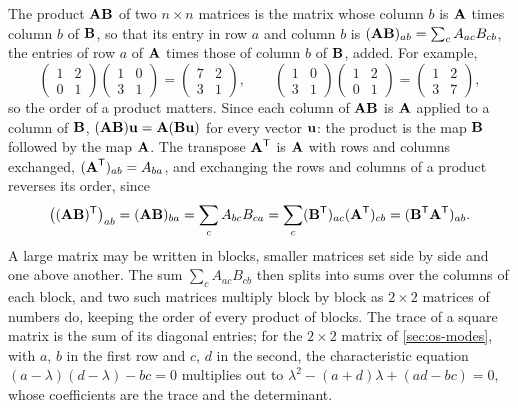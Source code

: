 \begin{toolbox}
The product $\bm{\mathrm{A}}\bm{\mathrm{B}}$ of two $n\times n$ matrices is the matrix whose
column $b$ is $\bm{\mathrm{A}}$ times column $b$ of $\bm{\mathrm{B}}$, so that its entry in
row $a$ and column $b$ is $(\bm{\mathrm{A}}\bm{\mathrm{B}})_{ab} = \sum_c A_{ac}B_{cb}$, the
entries of row $a$ of $\bm{\mathrm{A}}$ times those of column $b$ of $\bm{\mathrm{B}}$,
added. For example,
\begin{equation*}
   \begin{pmatrix} 1 & 2\\ 0 & 1 \end{pmatrix}
   \begin{pmatrix} 1 & 0\\ 3 & 1 \end{pmatrix}
   = \begin{pmatrix} 7 & 2\\ 3 & 1 \end{pmatrix} ,
   \qquad
   \begin{pmatrix} 1 & 0\\ 3 & 1 \end{pmatrix}
   \begin{pmatrix} 1 & 2\\ 0 & 1 \end{pmatrix}
   = \begin{pmatrix} 1 & 2\\ 3 & 7 \end{pmatrix} ,
\end{equation*}
so the order of a product matters. Since each column of $\bm{\mathrm{A}}\bm{\mathrm{B}}$ is
$\bm{\mathrm{A}}$ applied to a column of $\bm{\mathrm{B}}$, $(\bm{\mathrm{A}}\bm{\mathrm{B}})\bm{\mathrm{u}} =
\bm{\mathrm{A}}(\bm{\mathrm{B}}\bm{\mathrm{u}})$ for every vector $\bm{\mathrm{u}}$: the product is the map
$\bm{\mathrm{B}}$ followed by the map $\bm{\mathrm{A}}$. The transpose $\bm{\mathrm{A}}^{\mathsf T}$
is $\bm{\mathrm{A}}$ with rows and columns exchanged, $(\bm{\mathrm{A}}^{\mathsf T})_{ab} =
A_{ba}$, and exchanging the rows and columns of a product reverses its
order, since
\begin{equation*}
   \bigl((\bm{\mathrm{A}}\bm{\mathrm{B}})^{\mathsf T}\bigr)_{ab} = (\bm{\mathrm{A}}\bm{\mathrm{B}})_{ba}
   = \sum_c A_{bc}B_{ca} = \sum_c(\bm{\mathrm{B}}^{\mathsf T})_{ac}
   (\bm{\mathrm{A}}^{\mathsf T})_{cb} = (\bm{\mathrm{B}}^{\mathsf T}\bm{\mathrm{A}}^{\mathsf T})_{ab} .
\end{equation*}
A large matrix may be written in blocks, smaller matrices set side by side
and one above another. The sum $\sum_c A_{ac}B_{cb}$ then splits into sums
over the columns of each block, and two such matrices multiply block by
block as $2\times2$ matrices of numbers do, keeping the order of every
product of blocks. The trace of a square matrix is the sum of its diagonal
entries; for the $2\times2$ matrix of \cref{sec:os-modes}, with $a$, $b$
in the first row and $c$, $d$ in the second, the characteristic equation
$(a - \lambda)(d - \lambda) - bc = 0$ multiplies out to $\lambda^2 - (a +
d)\lambda + (ad - bc) = 0$, whose coefficients are the trace and the
determinant.
\end{toolbox}

